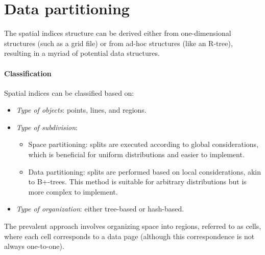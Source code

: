 \section{Data partitioning}

The spatial indices structure can be derived either from one-dimensional structures (such as a grid file) or from ad-hoc structures (like an R-tree), resulting in a myriad of potential data structures.

\paragraph*{Classification}
Spatial indices can be classified based on:
\begin{itemize}
    \item \textit{Type of objects}: points, lines, and regions. 
    \item \textit{Type of subdivision}: 
        \begin{itemize}
            \item Space partitioning: splits are executed according to global considerations, which is beneficial for uniform distributions and easier to implement.
            \item Data partitioning: splits are performed based on local considerations, akin to B+-trees. 
                This method is suitable for arbitrary distributions but is more complex to implement.
        \end{itemize}
    \item \textit{Type of organization}: either tree-based or hash-based. 
\end{itemize}
The prevalent approach involves organizing space into regions, referred to as cells, where each cell corresponds to a data page (although this correspondence is not always one-to-one).


